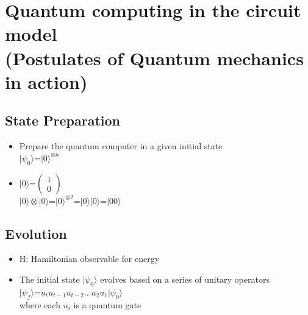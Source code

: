 \documentclass{article}
\begin{document}
\section{Quantum computing in the circuit model\\ (Postulates of Quantum mechanics in action)}
\subsection{State Preparation}
\begin{itemize}
    \item Prepare the quantum computer in a given initial state\\
       ${|\psi_{0}}\rangle$=${|0\rangle^{\otimes n}}$
\end{itemize}\begin{itemize}
    \item ${|0\rangle}$=${\begin{pmatrix}
1 \\
0
\end{pmatrix}}$\\
${|0\rangle\otimes|0\rangle}$=${|0\rangle^{\otimes2}}$=${|0\rangle|0\rangle}$=${|00\rangle}$
\end{itemize}

\subsection{Evolution}
\begin{itemize}
    \item Schrodinger's equation :\\\\
    ${i\frac{d|\psi\rangle}{dt}}$=${H|\psi\rangle}$\\\\
    ${|\psi(t)\rangle}$=${e^{-iHt}|\psi(0)\rangle$
\end{itemize}
\begin{itemize}
    \item H: Hamiltonian observable for energy
\end{itemize}
\begin{itemize}
    \item ${u_t}$=${e^{-iHt}$
\end{itemize}
\begin{itemize}
    \item The initial state ${|\psi_0\rangle}$ evolves based on a series of unitary operators  \\
    ${|\psi_f\rangle}$=${u_tu_{t-1}u_{t-2}...u_2u_1|\psi_0\rangle}$\\
    where each ${u_i}$ is a quantum gate
\end{itemize}
\end{document}
